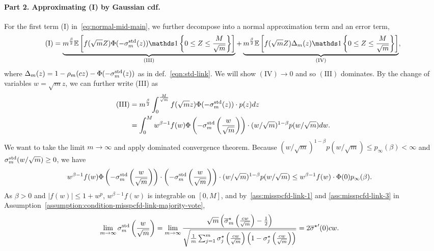 \paragraph{Part 2. Approximating (I) by Gaussian cdf.}
For the first term (I) in~\eqref{eq:normal-mid-main}, we further decompose into a normal approximation term and an error term,
\begin{align*}
  \mathrm{(I)} = \underbrace{m^{\frac{\beta}{2}}
    \Ep \left[f(\sqrt m Z)\Phi(-\linkstd(z))
      \ind\left\{0 \leq Z \leq \frac{M}{\sqrt m}\right\} \right]}_{\mathrm{(III)}} + \underbrace{m^{\frac{\beta}{2}} \Ep \left[f(\sqrt m Z)\Delta_m(z) \ind\left\{0 \leq Z \leq \frac{M}{\sqrt m}\right\} \right]}_{\mathrm{(IV)}}, %
\end{align*}
where $\Delta_m(z) = 1 - \rho_m(cz) - \Phi(-\sigma_m^{\textup{std}}(z))$ as in
def.~\eqref{eqn:std-link}. We will show $\mathrm{(IV)} \to 0$ and so
$\mathrm{(III)}$ dominates. By the change of variables $w = \sqrt{m}z$, we can
further write (III) as
\begin{align*}
  \mathrm{(III)} 
  & = m^{\frac{\beta}{2}} \int_0^{\frac{M}{\sqrt m}} f(\sqrt m z) \Phi
  ( -\sigma_m^{\textup{std}}(z)) \cdot p(z) d z \nonumber \\
  & = \int_0^{M} w^{\beta - 1} f(w) \Phi  \left( - \sigma_m^{\textup{std}}\left({\frac{w}{\sqrt m}}\right)\right) \cdot  (w/\sqrt{m})^{1-\beta} p(w/\sqrt{m}) d w   .
\end{align*}
We want to take the limit $m \to \infty$ and apply dominated convergence
theorem. Because $(w/\sqrt{m})^{1-\beta} p(w/\sqrt{m}) \leq p_\infty(\beta)
< \infty$ and $\sigma_m^{\textup{std}}(w/\sqrt m) \geq 0$, we have
\begin{align*}
	&  w^{\beta - 1} f(w) \Phi  \left( - \sigma_m^{\textup{std}}\left({\frac{w}{\sqrt m}}\right)\right) \cdot  \left( - \sigma_m^{\textup{std}}\left({\frac{w}{\sqrt m}}\right)\right) \cdot  (w/\sqrt{m})^{1-\beta} p(w/\sqrt{m}) \leq w^{\beta - 1} f(w) \cdot \Phi(0) p_\infty(\beta)   .
\end{align*} 
As $\beta > 0$ and $|f(w)| \leq 1 + w^p$, $w^{\beta - 1} f(w)$ is integrable
on $[0, M]$, and by~\eqref{ass:misspcfd-link-1} and \eqref{ass:misspcfd-link-3}
  in Assumption~\ref{assumption:condition-misspcfd-link-majority-vote},
\begin{align*}
	\lim_{m \to \infty} \sigma_m^{\textup{std}}\left({\frac{w}{\sqrt m}}\right) & = \lim_{m \to \infty}\frac{\sqrt{m}\left(\overline{\sigma}_m^\star\left({\frac{cw}{\sqrt m}}\right)-\frac{1}{2}\right)}{\sqrt{ \frac{1}{m} \sum_{j=1}^m \sigma_j^\star\left({\frac{cw}{\sqrt m}}\right)\left({1 - \sigma_j^\star\left({\frac{cw}{\sqrt m}}\right)}\right)}} =  2 {\overline{\sigma}^\star}'(0) cw   .
\end{align*}
